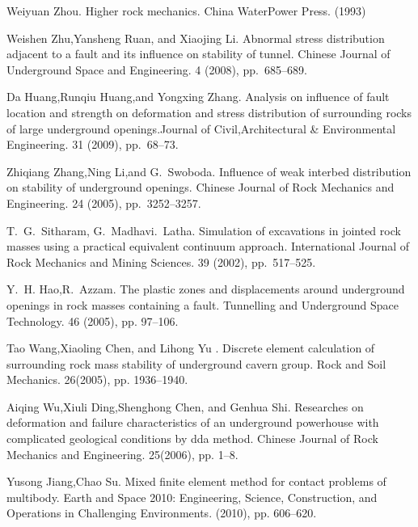 
\begin{thebibliography}{10}

{\sc Weiyuan Zhou}. {Higher rock mechanics}. China WaterPower Press.  (1993) 

{\sc Weishen Zhu,Yansheng Ruan, and Xiaojing Li}. {Abnormal stress distribution adjacent to a fault and its influence on stability of tunnel}. Chinese Journal of Underground Space and Engineering. 4 (2008), pp.~685--689.

{\sc Da Huang,Runqiu Huang,and Yongxing Zhang}. {Analysis on influence of fault location and strength on deformation and stress distribution of surrounding rocks of large underground openings}.Journal of Civil,Architectural \& Environmental Engineering. 31 (2009), pp.~68--73.

{\sc Zhiqiang Zhang,Ning Li,and G.~Swoboda}. {Influence of weak interbed distribution on stability of underground openings}.  Chinese Journal of Rock Mechanics and Engineering. 24 (2005), pp.~3252--3257.

{\sc T.~G.~Sitharam, G.~Madhavi.~Latha}. {Simulation of excavations in jointed rock masses using a practical equivalent continuum approach}. International Journal of Rock Mechanics and Mining Sciences. 39 (2002), pp.~517--525.

{\sc Y.~H. Hao,R.~Azzam}.
\newblock The plastic zones and displacements around underground openings in rock masses containing a fault.
\newblock Tunnelling and Underground Space Technology. 46 (2005), pp. 97--106.

{\sc Tao Wang,Xiaoling Chen, and Lihong Yu }.
\newblock Discrete element calculation of surrounding rock mass stability of underground cavern group.
\newblock Rock and Soil Mechanics. 26(2005), pp. 1936--1940.

{\sc Aiqing Wu,Xiuli Ding,Shenghong Chen, and Genhua Shi}.
\newblock Researches on deformation and failure characteristics of an underground powerhouse with complicated geological conditions by dda method.
\newblock Chinese Journal of Rock Mechanics and Engineering. 25(2006), pp. 1--8.

{\sc Yusong Jiang,Chao Su}.
\newblock Mixed finite element method for contact problems of multibody.
\newblock Earth and Space 2010: Engineering, Science, Construction, and Operations in Challenging Environments. (2010), pp. 606--620.

\end{thebibliography}